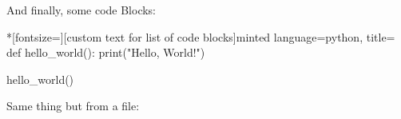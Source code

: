 \documentclass[../thesis.tex]{subfiles}
\begin{document}
    And finally, some code Blocks:

    \begin{codeBlock}*[fontsize=\scriptsize][custom text for list of code blocks]{minted language=python, title=}
        def hello_world():
            print("Hello, World!")

        hello_world()
    \end{codeBlock}

    Same thing but from a file:


    \ifSubfilesClassLoaded{%
        \printbibliography{}%
    }{}
\end{document}
